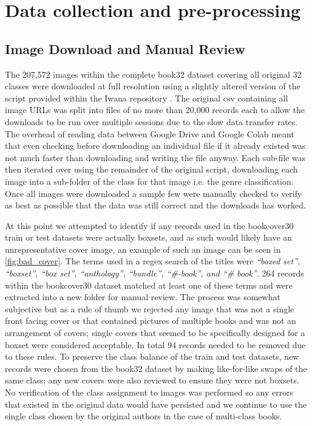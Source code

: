 \documentclass[12pt]{article}
\numberwithin{equation}{section}
\numberwithin{figure}{section}
\begin{document}
\section{Data collection and pre-processing} 
\label{sec:Data_collection_and_pre-processing} 
\subsection{Image Download and Manual Review} 
\label{sub:Image Download and Manual Review} 
The 207,572 images within the complete book32 dataset covering all original 32 classes were downloaded at full resolution using a slightly altered version of the script provided within the Iwana repository \cite{iwanarepo}. The original csv containing all image URLs was split into files of no more than 20,000 records each to allow the downloads to be run over multiple sessions due to the slow data transfer rates. The overhead of reading data between Google Drive and Google Colab meant that even checking before downloading an individual file if it already existed was not much faster than downloading and writing the file anyway. Each sub-file was then iterated over using the remainder of the original script, downloading each image into a sub-folder of the class for that image i.e. the genre classification. Once all images were downloaded a sample few were manually checked to verify as best as possible that the data was still correct and the downloads has worked. 

At this point we attempted to identify if any records used in the bookcover30 train or test datasets were actually boxsets, and as such would likely have an unrepresentative cover image, an example of such an image can be seen in \cref{fig:bad_cover}. The terms used in a regex search of the titles were \emph{``boxed set'', ``boxset'', ``box set'', ``anthology'', ``bundle'', ``\#-book'', and ``\# book''}. 264 records within the bookcover30 dataset matched at least one of these terms and were extracted into a new folder for manual review. The process was somewhat subjective but as a rule of thumb we rejected any image that was not a single front facing cover or that contained pictures of multiple books and was not an arrangement of covers; single covers that seemed to be specifically designed for a boxset were considered acceptable. In total 94 records needed to be removed due to these rules. To preserve the class balance of the train and test datasets, new records were chosen from the book32 dataset by making like-for-like swaps of the same class; any new covers were also reviewed to ensure they were not boxsets. No verification of the class assignment to images was performed so any errors that existed in the original data would have persisted and we continue to use the single class chosen by the original authors in the case of multi-class books.
\end{document}
